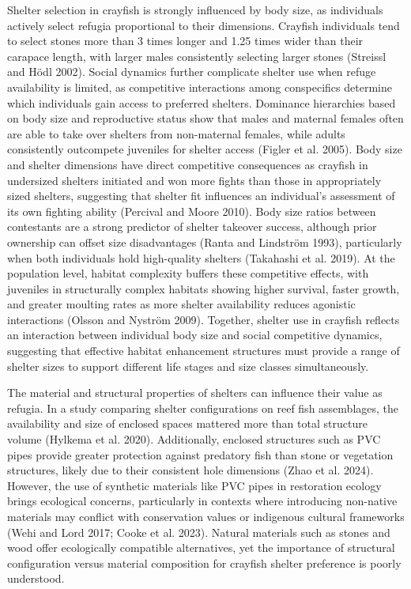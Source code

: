 \documentclass[
  12pt,
  a4paper,
  oneside]{scrbook}
\begin{document}
Shelter selection in crayfish is strongly influenced by body size, as
individuals actively select refugia proportional to their dimensions.
Crayfish individuals tend to select stones more than 3 times longer and
1.25 times wider than their carapace length, with larger males
consistently selecting larger stones (Streissl and Hödl 2002). Social
dynamics further complicate shelter use when refuge availability is
limited, as competitive interactions among conspecifics determine which
individuals gain access to preferred shelters. Dominance hierarchies
based on body size and reproductive status show that males and maternal
females often are able to take over shelters from non-maternal females,
while adults consistently outcompete juveniles for shelter access
(Figler et al. 2005). Body size and shelter dimensions have direct
competitive consequences as crayfish in undersized shelters initiated
and won more fights than those in appropriately sized shelters,
suggesting that shelter fit influences an individual's assessment of its
own fighting ability (Percival and Moore 2010). Body size ratios between
contestants are a strong predictor of shelter takeover success, although
prior ownership can offset size disadvantages (Ranta and Lindström
1993), particularly when both individuals hold high-quality shelters
(Takahashi et al. 2019). At the population level, habitat complexity
buffers these competitive effects, with juveniles in structurally
complex habitats showing higher survival, faster growth, and greater
moulting rates as more shelter availability reduces agonistic
interactions (Olsson and Nyström 2009). Together, shelter use in
crayfish reflects an interaction between individual body size and social
competitive dynamics, suggesting that effective habitat enhancement
structures must provide a range of shelter sizes to support different
life stages and size classes simultaneously.

The material and structural properties of shelters can influence their
value as refugia. In a study comparing shelter configurations on reef
fish assemblages, the availability and size of enclosed spaces mattered
more than total structure volume (Hylkema et al. 2020). Additionally,
enclosed structures such as PVC pipes provide greater protection against
predatory fish than stone or vegetation structures, likely due to their
consistent hole dimensions (Zhao et al. 2024). However, the use of
synthetic materials like PVC pipes in restoration ecology brings
ecological concerns, particularly in contexts where introducing
non-native materials may conflict with conservation values or indigenous
cultural frameworks (Wehi and Lord 2017; Cooke et al. 2023). Natural
materials such as stones and wood offer ecologically compatible
alternatives, yet the importance of structural configuration versus
material composition for crayfish shelter preference is poorly
understood.
\end{document}
